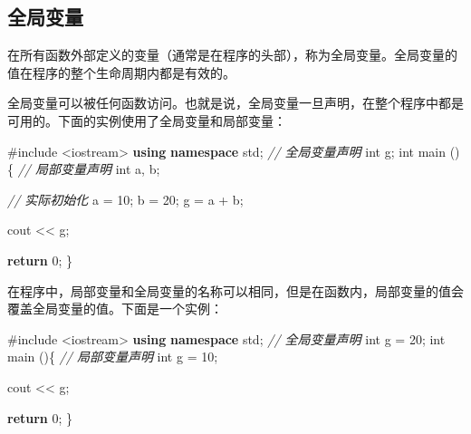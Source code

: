 \documentclass[
]{article}
\newenvironment{Shaded}{}{}
\newcommand{\CommentTok}[1]{\textcolor[rgb]{0.38,0.63,0.69}{\textit{#1}}}
\newcommand{\ControlFlowTok}[1]{\textcolor[rgb]{0.00,0.44,0.13}{\textbf{#1}}}
\newcommand{\DataTypeTok}[1]{\textcolor[rgb]{0.56,0.13,0.00}{#1}}
\newcommand{\DecValTok}[1]{\textcolor[rgb]{0.25,0.63,0.44}{#1}}
\newcommand{\ImportTok}[1]{#1}
\newcommand{\KeywordTok}[1]{\textcolor[rgb]{0.00,0.44,0.13}{\textbf{#1}}}
\newcommand{\NormalTok}[1]{#1}
\newcommand{\OperatorTok}[1]{\textcolor[rgb]{0.40,0.40,0.40}{#1}}
\newcommand{\PreprocessorTok}[1]{\textcolor[rgb]{0.74,0.48,0.00}{#1}}
\begin{document}
\hypertarget{ux5168ux5c40ux53d8ux91cf}{%
\subsection{全局变量}\label{ux5168ux5c40ux53d8ux91cf}}

在所有函数外部定义的变量（通常是在程序的头部），称为全局变量。全局变量的值在程序的整个生命周期内都是有效的。

全局变量可以被任何函数访问。也就是说，全局变量一旦声明，在整个程序中都是可用的。下面的实例使用了全局变量和局部变量：

\begin{Shaded}
\begin{Highlighting}[]
\PreprocessorTok{\#include }\ImportTok{\textless{}iostream\textgreater{}}
\KeywordTok{using} \KeywordTok{namespace}\NormalTok{ std}\OperatorTok{;}
 \CommentTok{// 全局变量声明}
 \DataTypeTok{int}\NormalTok{ g}\OperatorTok{;}
 \DataTypeTok{int}\NormalTok{ main }\OperatorTok{()\{}
  \CommentTok{// 局部变量声明}
  \DataTypeTok{int}\NormalTok{ a}\OperatorTok{,}\NormalTok{ b}\OperatorTok{;}
 
  \CommentTok{// 实际初始化}
\NormalTok{  a }\OperatorTok{=} \DecValTok{10}\OperatorTok{;}
\NormalTok{  b }\OperatorTok{=} \DecValTok{20}\OperatorTok{;}
\NormalTok{  g }\OperatorTok{=}\NormalTok{ a }\OperatorTok{+}\NormalTok{ b}\OperatorTok{;}
 
\NormalTok{  cout }\OperatorTok{\textless{}\textless{}}\NormalTok{ g}\OperatorTok{;}
 
  \ControlFlowTok{return} \DecValTok{0}\OperatorTok{;}
\OperatorTok{\}}
\end{Highlighting}
\end{Shaded}

在程序中，局部变量和全局变量的名称可以相同，但是在函数内，局部变量的值会覆盖全局变量的值。下面是一个实例：

\begin{Shaded}
\begin{Highlighting}[]
\PreprocessorTok{\#include }\ImportTok{\textless{}iostream\textgreater{}}
\KeywordTok{using} \KeywordTok{namespace}\NormalTok{ std}\OperatorTok{;}
 \CommentTok{// 全局变量声明}
 \DataTypeTok{int}\NormalTok{ g }\OperatorTok{=} \DecValTok{20}\OperatorTok{;}
 \DataTypeTok{int}\NormalTok{ main }\OperatorTok{()\{}
  \CommentTok{// 局部变量声明}
  \DataTypeTok{int}\NormalTok{ g }\OperatorTok{=} \DecValTok{10}\OperatorTok{;}
 
\NormalTok{  cout }\OperatorTok{\textless{}\textless{}}\NormalTok{ g}\OperatorTok{;}
 
  \ControlFlowTok{return} \DecValTok{0}\OperatorTok{;}
\OperatorTok{\}}
\end{Highlighting}
\end{Shaded}
\end{document}
